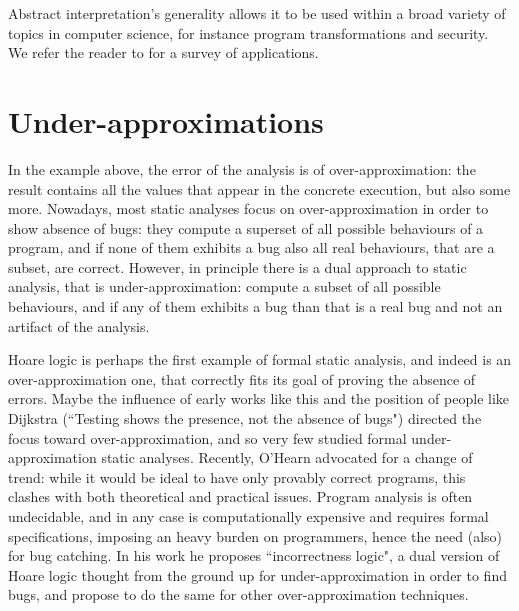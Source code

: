 Abstract interpretation's generality allows it to be used within a broad variety of topics in computer science, for instance program transformations and security. We refer the reader to \cite{cousot-absint-survey} for a survey of applications.

\section{Under-approximations}
In the example above, the error of the analysis is of over-approximation: the result contains all the values that appear in the concrete execution, but also some more.
Nowadays, most static analyses focus on over-approximation in order to show absence of bugs: they compute a superset of all possible behaviours of a program, and if none of them exhibits a bug also all real behaviours, that are a subset, are correct. However, in principle there is a dual approach to static analysis, that is under-approximation: compute a subset of all possible behaviours, and if any of them exhibits a bug than that is a real bug and not an artifact of the analysis.

Hoare logic \cite{hoare-logic} is perhaps the first example of formal static analysis, and indeed is an over-approximation one, that correctly fits its goal of proving the absence of errors. Maybe the influence of early works like this and the position of people like Dijkstra (``Testing shows the presence, not the absence of bugs") directed the focus toward over-approximation, and so very few studied formal under-approximation static analyses.
Recently, O'Hearn \cite{ohearn-incorrectness-logic} advocated for a change of trend: while it would be ideal to have only provably correct programs, this clashes with both theoretical and practical issues. Program analysis is often undecidable, and in any case is computationally expensive and requires formal specifications, imposing an heavy burden on programmers, hence the need (also) for bug catching. In his work he proposes ``incorrectness logic", a dual version of Hoare logic thought from the ground up for under-approximation in order to find bugs, and propose to do the same for other over-approximation techniques.

